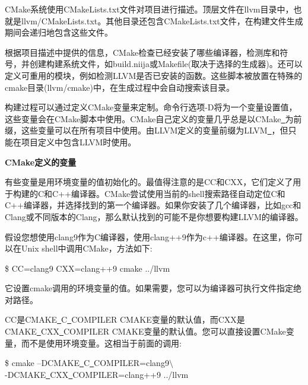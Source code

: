 CMake系统使用CMakeLists.txt文件对项目进行描述。顶层文件在llvm目录中，也就是llvm/CMakeLists.txt。其他目录还包含CMakeLists.txt文件，在构建文件生成期间会递归地包含这些文件。\par

根据项目描述中提供的信息，CMake检查已经安装了哪些编译器，检测库和符号，并创建构建系统文件，如build.niija或Makefile(取决于选择的生成器)。还可以定义可重用的模块，例如检测LLVM是否已安装的函数。这些脚本被放置在特殊的cmake目录(llvm/cmake)中，在生成过程中会自动搜索该目录。\par

构建过程可以通过定义CMake变量来定制。命令行选项-D将为一个变量设置值，这些变量会在CMake脚本中使用。CMake自己定义的变量几乎总是以CMake\underline{~}为前缀，这些变量可以在所有项目中使用。由LLVM定义的变量前缀为LLVM\underline{~}，但只能在项目定义中包含LLVM时使用。\par

\hspace*{\fill} \par %
\textbf{CMake定义的变量}

有些变量是用环境变量的值初始化的。最值得注意的是CC和CXX，它们定义了用于构建的C和C++编译器。CMake尝试使用当前的shell搜索路径自动定位C和C++编译器，并选择找到的第一个编译器。如果你安装了几个编译器，比如gcc和Clang或不同版本的Clang，那么默认找到的可能不是你想要构建LLVM的编译器。\par

假设您想使用clang9作为C编译器，使用clang++9作为c++编译器。在这里，你可以在Unix shell中调用CMake，方法如下:\par

\begin{tcolorbox}[colback=white,colframe=black]
	\$ CC=clang9 CXX=clang++9 cmake ../llvm
\end{tcolorbox}

它设置cmake调用的环境变量的值。如果需要，您可以为编译器可执行文件指定绝对路径。\par

CC是CMAKE\underline{~}C\underline{~}COMPILER CMAKE变量的默认值，而CXX是CMAKE\underline{~}CXX\underline{~}COMPILER CMAKE变量的默认值。您可以直接设置CMake变量，而不是使用环境变量。这相当于前面的调用:\par

\begin{tcolorbox}[colback=white,colframe=black]
	\$ cmake –DCMAKE\underline{~}C\underline{~}COMPILER=clang9$\setminus$\\
	-DCMAKE\underline{~}CXX\underline{~}COMPILER=clang++9 ../llvm
\end{tcolorbox}

